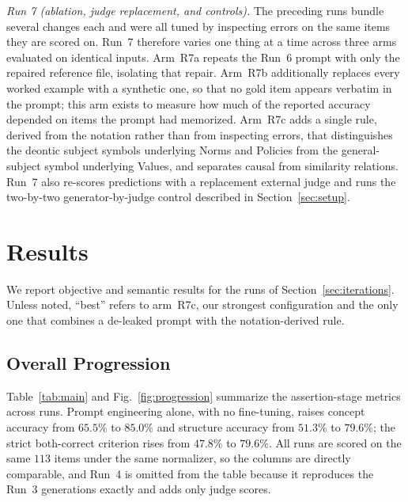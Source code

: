 \documentclass[onecolumn, 11pt]{IEEEtran}
\begin{document}
\emph{Run 7 (ablation, judge replacement, and controls).} The preceding runs bundle several changes each and were all tuned by inspecting errors on the same items they are scored on. Run~7 therefore varies one thing at a time across three arms evaluated on identical inputs. Arm~R7a repeats the Run~6 prompt with only the repaired reference file, isolating that repair. Arm~R7b additionally replaces every worked example with a synthetic one, so that no gold item appears verbatim in the prompt; this arm exists to measure how much of the reported accuracy depended on items the prompt had memorized. Arm~R7c adds a single rule, derived from the notation rather than from inspecting errors, that distinguishes the deontic subject symbols underlying Norms and Policies from the general-subject symbol underlying Values, and separates causal from similarity relations. Run~7 also re-scores predictions with a replacement external judge and runs the two-by-two generator-by-judge control described in Section~\ref{sec:setup}.

\section{Results}
\label{sec:results}

We report objective and semantic results for the runs of Section~\ref{sec:iterations}. Unless noted, ``best'' refers to arm~R7c, our strongest configuration and the only one that combines a de-leaked prompt with the notation-derived rule.

\subsection{Overall Progression}
Table~\ref{tab:main} and Fig.~\ref{fig:progression} summarize the assertion-stage metrics across runs. Prompt engineering alone, with no fine-tuning, raises concept accuracy from $65.5\%$ to $85.0\%$ and structure accuracy from $51.3\%$ to $79.6\%$; the strict both-correct criterion rises from $47.8\%$ to $79.6\%$. All runs are scored on the same $113$ items under the same normalizer, so the columns are directly comparable, and Run~4 is omitted from the table because it reproduces the Run~3 generations exactly and adds only judge scores.
\end{document}
